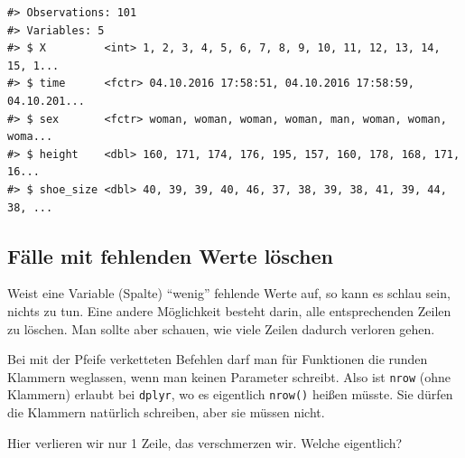 \documentclass[12pt,ngerman,]{book}
\makeatletter
\newenvironment{Shaded}{\begin{snugshade}}{\end{snugshade}}
\newcommand{\KeywordTok}[1]{\textcolor[rgb]{0.13,0.29,0.53}{\textbf{{#1}}}}
\newcommand{\StringTok}[1]{\textcolor[rgb]{0.31,0.60,0.02}{{#1}}}
\newcommand{\CommentTok}[1]{\textcolor[rgb]{0.56,0.35,0.01}{\textit{{#1}}}}
\newcommand{\NormalTok}[1]{{#1}}
\newenvironment{kframe}{%
\medskip{}
\setlength{\fboxsep}{.8em}
 \def\at@end@of@kframe{}%
 \ifinner\ifhmode%
  \def\at@end@of@kframe{\end{minipage}}%
  \begin{minipage}{\columnwidth}%
 \fi\fi%
 \def\FrameCommand##1{\hskip\@totalleftmargin \hskip-\fboxsep
 \colorbox{shadecolor}{##1}\hskip-\fboxsep
     \hskip-\linewidth \hskip-\@totalleftmargin \hskip\columnwidth}%
 \MakeFramed {\advance\hsize-\width
   \@totalleftmargin\z@ \linewidth\hsize
   \@setminipage}}%
 {\par\unskip\endMakeFramed%
 \at@end@of@kframe}
\renewenvironment{Shaded}{\begin{kframe}}{\end{kframe}}
\let\BeginKnitrBlock\begin \let\EndKnitrBlock\end
\makeatother
\begin{document}
\begin{verbatim}
#> Observations: 101
#> Variables: 5
#> $ X         <int> 1, 2, 3, 4, 5, 6, 7, 8, 9, 10, 11, 12, 13, 14, 15, 1...
#> $ time      <fctr> 04.10.2016 17:58:51, 04.10.2016 17:58:59, 04.10.201...
#> $ sex       <fctr> woman, woman, woman, woman, man, woman, woman, woma...
#> $ height    <dbl> 160, 171, 174, 176, 195, 157, 160, 178, 168, 171, 16...
#> $ shoe_size <dbl> 40, 39, 39, 40, 46, 37, 38, 39, 38, 41, 39, 44, 38, ...
\end{verbatim}

\subsection{Fälle mit fehlenden Werte
löschen}\label{falle-mit-fehlenden-werte-loschen}

Weist eine Variable (Spalte) ``wenig'' fehlende Werte auf, so kann es
schlau sein, nichts zu tun. Eine andere Möglichkeit besteht darin, alle
entsprechenden Zeilen zu löschen. Man sollte aber schauen, wie viele
Zeilen dadurch verloren gehen.

\begin{Shaded}
\end{Shaded}

\BeginKnitrBlock{rmdcaution}
Bei mit der Pfeife verketteten Befehlen darf man für Funktionen die
runden Klammern weglassen, wenn man keinen Parameter schreibt. Also ist
\texttt{nrow} (ohne Klammern) erlaubt bei \texttt{dplyr}, wo es
eigentlich \texttt{nrow()} heißen müsste. Sie dürfen die Klammern
natürlich schreiben, aber sie müssen nicht.
\EndKnitrBlock{rmdcaution}

Hier verlieren wir nur 1 Zeile, das verschmerzen wir. Welche eigentlich?

\begin{Shaded}
\end{Shaded}
\end{document}
